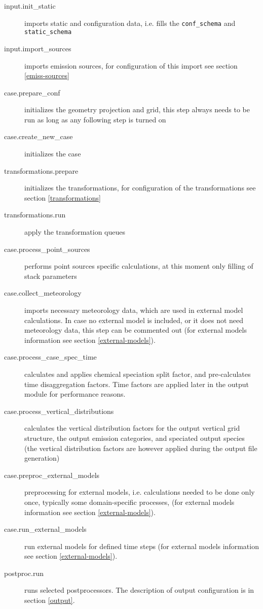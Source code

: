 \documentclass[a4paper,11pt]{article}
\begin{document}
\begin{description}
    \item [input.init\_static] imports static and configuration data, i.e. fills the \verb|conf_schema| and \verb|static_schema|
    \item [input.import\_sources] imports emission sources, for configuration of this import see section \ref{emiss-sources} 
    \item [case.prepare\_conf] initializes the geometry projection and grid, this step always needs to be run as long as any following step is turned on 
    \item [case.create\_new\_case] initializes the case
    \item [transformations.prepare] initializes the transformations, for configuration of the transformations see section \ref{transformations}
    \item [transformations.run] apply the transformation queues
    \item [case.process\_point\_sources] performs point sources specific calculations, at this moment only filling of stack parameters
    \item [case.collect\_meteorology] imports necessary meteorology data, which are used in external model calculations. In case no external model is included, or it does not need meteorology data, this step can be commented out (for external models information see section \ref{external-models}).
    \item [case.process\_case\_spec\_time ] calculates and applies chemical speciation split factor, and pre-calculates time disaggregation factors. Time factors are applied later in the output module for performance reasons.
    \item [case.process\_vertical\_distributions ] calculates the vertical distribution factors for the output vertical grid structure, the output emission categories, and speciated output species (the vertical distribution factors are however applied during the output file generation)
    \item [case.preproc\_external\_models] preprocessing for external models, i.e. calculations needed to be done only once, typically some domain-specific processes, (for external models information see section \ref{external-models}).
    \item [case.run\_external\_models] run external models for defined time steps (for external models information see section \ref{external-models}).
    \item [postproc.run] runs selected postprocessors. The description of output configuration is in section \ref{output}.
\end{description}
\end{document}
